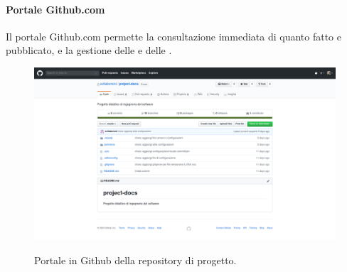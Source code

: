 \documentclass[../norme-di-progetto.tex]{subfiles}
\begin{document}
\paragraph{Portale Github.com}
Il portale Github.com permette la consultazione immediata di quanto fatto e pubblicato, e la gestione delle  e delle .
\begin{figure}[H]
  \centering
  \includegraphics[width=15cm]{img/github.png}
  \label{fig:github}
  \caption{Portale in Github della repository di progetto.}
\end{figure}
\end{document}
